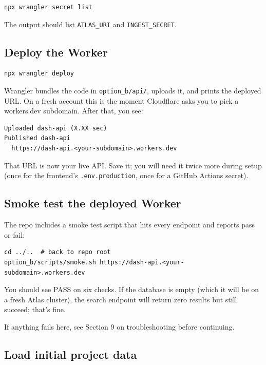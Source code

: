\documentclass[11pt,a4paper]{article}
\begin{document}
\begin{lstlisting}[style=shell]
npx wrangler secret list
\end{lstlisting}

The output should list \texttt{ATLAS\_URI} and \texttt{INGEST\_SECRET}.

\subsection{Deploy the Worker}

\begin{lstlisting}[style=shell]
npx wrangler deploy
\end{lstlisting}

Wrangler bundles the code in \texttt{option\_b/api/}, uploads it, and prints the deployed URL. On a fresh account this is the moment Cloudflare asks you to pick a workers.dev subdomain. After that, you see:

\begin{lstlisting}[style=shell]
Uploaded dash-api (X.XX sec)
Published dash-api
  https://dash-api.<your-subdomain>.workers.dev
\end{lstlisting}

That URL is now your live API. Save it; you will need it twice more during setup (once for the frontend's \texttt{.env.production}, once for a GitHub Actions secret).

\subsection{Smoke test the deployed Worker}

The repo includes a smoke test script that hits every endpoint and reports pass or fail:

\begin{lstlisting}[style=shell]
cd ../..  # back to repo root
option_b/scripts/smoke.sh https://dash-api.<your-subdomain>.workers.dev
\end{lstlisting}

You should see PASS on six checks. If the database is empty (which it will be on a fresh Atlas cluster), the search endpoint will return zero results but still succeed; that's fine.

If anything fails here, see Section 9 on troubleshooting before continuing.

\subsection{Load initial project data}
\end{document}
